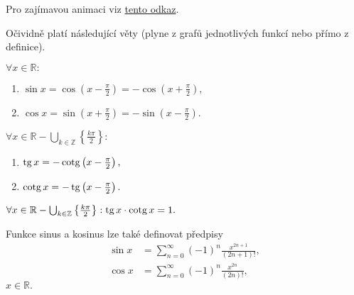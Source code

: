 \begin{pozn}
    Pro zajímavou animaci viz \href{https://upload.wikimedia.org/wikipedia/commons/3/3b/Circle_cos_sin.gif}{tento odkaz}.
\end{pozn}

\begin{pozn}
    Očividně platí následující věty (plyne z grafů jednotlivých funkcí nebo přímo z definice).
\end{pozn}

\begin{veta}
  $\forall x \in \mathbb{R}:$
  \begin{enumerate}[$i.$]
    \item $\sin x = \cos \left(x- \frac{\pi}{2}\right)=-\cos\left(x+\frac{\pi}{2}\right),$
 	\item $\cos x = \sin \left(x+\frac{\pi}{2}\right)=-\sin \left(x- \frac{\pi}{2} \right).$
  \end{enumerate}
\end{veta}

\begin{veta}
  $\forall x \in \mathbb{R}-\bigcup_{k\in \mathbb Z} \left \{ \frac{k\pi}{2} \right \} :$
  \begin{enumerate}[$i.$]
    \item $\operatorname{tg} x = -\operatorname{cotg} \left ( x- \frac{\pi}{2} \right ), $
 	\item $\operatorname{cotg} x = -\operatorname{tg} \left ( x- \frac{\pi}{2} \right ) .$
  \end{enumerate}
\end{veta}

\begin{veta}
  $\forall x \in \mathbb{R}-\bigcup_{k\in \mathbb Z} \left \{ \frac{k\pi}{2} \right \}: \operatorname{tg} x \cdot \operatorname{cotg} x = 1.$
\end{veta}

\begin{pozn}
    Funkce sinus a kosinus lze také definovat předpisy
    \begin{align*}
        \sin x & = \sum_{n=0}^\infty (-1)^n \frac{x^{2n+1}}{(2n+1)!},\\
        \cos x & = \sum_{n=0}^\infty (-1)^n \frac{x^{2n}}{(2n)!},
    \end{align*}
    $x \in \mathbb R.$
\end{pozn}
